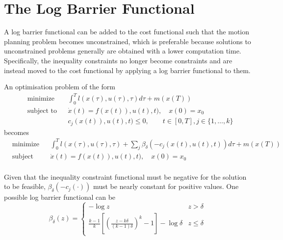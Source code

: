 \section{The Log Barrier Functional}
\label{sec:logbarrierfunc}

\par A log barrier functional can be added to the cost functional such that the motion planning problem becomes unconstrained, which is preferable because solutions to unconstrained problems generally are obtained with a lower computation time. Specifically, the inequality constraints no longer become constraints and are instead moved to the cost functional by applying a log barrier functional to them.
\par An optimisation problem of the form 
\begin{equation}
    \label{eq:opt_prob_without_log_bar}
    \begin{aligned}
    & \text{minimize} && \int_0^T l(x(\tau),u(\tau),\tau)d\tau + m(x(T)) \\
    & \text{subject to}  && \dot{x}(t) = f(x(t)),u(t),t),\quad x(0)=x_0 \\
        & && c_j(x(t)),u(t),t)\leq 0, \qquad t\in [0,T],j\in \{1,\dots,k \}
    \end{aligned}
\end{equation}
becomes
\begin{equation}
    \label{eq:opt_prob_with_log_bar}
    \begin{aligned}
    & \text{minimize} && \int_0^T l(x(\tau),u(\tau),\tau)+\sum_j \beta_\delta(-c_j(x(t),u(t),t))d\tau + m(x(T)) \\
    & \text{subject to}  && \dot{x}(t) = f(x(t)),u(t),t),\quad x(0)=x_0 \\
    \end{aligned}
\end{equation}
\par Given that the inequality constraint functional must be negative for the solution to be feasible, $\beta_\delta(-c_j(\cdot))$ must be nearly constant for positive values. One possible log barrier functional can be
\begin{equation}
    \beta_\delta (z) = 
    \begin{cases}
        -\log{} z & z>\delta \\
        \frac{k-1}{k}\left[\left(\frac{z-k\delta}{(k-1)\delta}\right)^k-1\right]-\log{}\delta & z\leq \delta
    \end{cases}
\end{equation}
